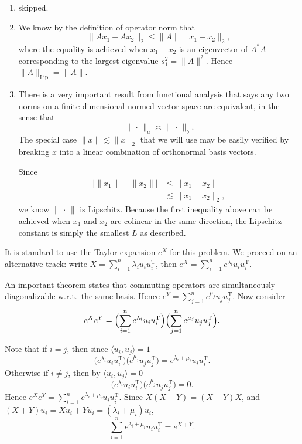 \documentclass[11pt]{article}
\newcommand{\blank}{\,\cdot\,}
\newcommand{\inp}[2]{\langle #1, #2 \rangle}
\newcommand{\nm}[1]{\lVert #1 \rVert}
\newcommand{\trp}{\mathrm T}
\theoremstyle{plain}
\theoremstyle{definition}
\theoremstyle{remark}
\theoremstyle{definition}
\newenvironment{mansol}[1]{%
  \renewcommand\themansolinner{#1}%
  \mansolinner
}{\endmansolinner}
\begin{document}
\begin{mansol}{5.1.3}
\begin{enumerate}[label=(\alph*)]
\item skipped.
\item We know by the definition of operator norm that \[\nm{Ax_1 - Ax_2}_2 \leq \nm{A}\nm{x_1 - x_2}_2,\] where the equality is achieved when $x_1 - x_2$ is an eigenvector of $A^*A$ corresponding to the largest eigenvalue $s_1^2 = \nm{A}^2$. Hence $\nm{A}_\mathrm{Lip} = \nm{A}$.
\item There is a very important result from functional analysis that says any two norms on a finite-dimensional normed vector space are equivalent, in the sense that \[\nm{\blank}_a \asymp \nm{\blank}_b.\] The special case $\nm{x} \lesssim \nm{x}_2$ that we will use may be easily verified by breaking $x$ into a linear combination of orthonormal basis vectors.

Since \begin{align*}
\bigl\lvert\nm{x_1} - \nm{x_2}\bigr\rvert & \leq \nm{x_1 - x_2} \\
& \lesssim \nm{x_1 - x_2}_2,
\end{align*}
we know $\nm{\blank}$ is Lipschitz. Because the first inequality above can be achieved when $x_1$ and $x_2$ are colinear in the same direction, the Lipschitz constant is simply the smallest $L$ as described.
\end{enumerate}
\end{mansol}
\begin{mansol}{5.4.6}
It is standard to use the Taylor expansion $e^X$ for this problem. We proceed on an alternative track: write $X = \sum_{i=1}^n \lambda_i u_i u_i^\trp$, then $e^X = \sum_{i=1}^n e^{\lambda_i} u_i u_i^\trp$.

An important theorem states that commuting operators are simultaneously diagonalizable w.r.t.\ the same basis. Hence $e^Y = \sum_{j=1}^n e^{\mu_j}u_j u_j^\trp$. Now consider \[e^X e^Y = \Bigl(\sum_{i=1}^n e^{\lambda_i} u_i u_i^\trp\Bigr)\Bigl(\sum_{j=1}^n e^{\mu_j} u_j u_j^\trp\Bigr).\]

Note that if $i = j$, then since $\inp{u_i}{u_j} = 1$ \[
\bigl(e^{\lambda_i} u_i u_i^\trp\bigr)\bigl(e^{\mu_j} u_j u_j^\trp\bigr) = e^{\lambda_i + \mu_i}u_i u_i^\trp.
\]
Otherwise if $i \neq j$, then by $\inp{u_i}{u_j} = 0$ \[
\bigl(e^{\lambda_i} u_i u_i^\trp\bigr)\bigl(e^{\mu_j} u_j u_j^\trp\bigr) = 0.
\]
Hence $e^Xe^Y = \sum_{i=1}^n e^{\lambda_i + \mu_i}u_i u_i^\trp$. Since $X(X+Y) = (X+Y)X$, and $(X+Y)u_i = Xu_i + Yu_i = (\lambda_i + \mu_i)u_i$, \[\sum_{i=1}^n e^{\lambda_i + \mu_i}u_i u_i^\trp = e^{X+Y}.\]
\end{mansol}
\end{document}
